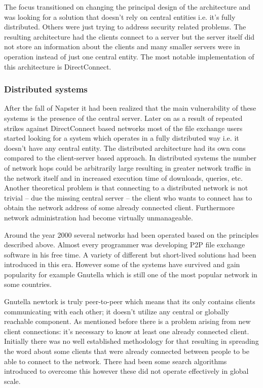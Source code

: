 \documentclass[a4paper]{article}
\begin{document}
The focus transitioned on changing the principal design of the architecture and was looking for a solution that doesn't
rely on central entities i.e. it's fully distributed. Others were just trying to address security related problems. The
resulting architecture had the clients connect to a server but the server itself did not store an information about the
clients and many smaller servers were in operation instead of just one central entity. The most notable implementation
of this architecture is DirectConnect.

\subsubsection{Distributed systems}

After the fall of Napster it had been realized that the main vulnerability of these systems is the presence of the
central server. Later on as a result of repeated strikes against DirectConnect based networks most of the file exchange
users started looking for a system which operates in a fully distributed way i.e. it doesn't have any central entity.
The distributed architecture had its own cons compared to the client-server based approach. In distributed systems the
number of network hops could be arbitrarily large resulting in greater network traffic in the network itself and in
increased execution time of downloads, queries, etc. Another theoretical problem is that connecting to a distributed
network is not trivial -- due the missing central server -- the client who wants to connect has to obtain the network
address of some already connected client. Furthermore network administration had become virtually unmanageable.

Around the year 2000 several networks had been operated based on the principles described above. Almost every
programmer was developing P2P file exchange software in his free time. A variety of different but short-lived solutions
had been introduced in this era. However some of the systems have survived and gain popularity for example Gnutella
which is still one of the most popular network in some countries.

Gnutella newtork is truly peer-to-peer which means that its only contains clients communicating with each other; it
doesn't utilize any central or globally reachable component. As mentioned before there is a problem arising from new
client connections: it's necessary to know at least one already connected client. Initially there was no well
established methodology for that resulting in spreading the word about some clients that were already connected between
people to be able to connect to the network. There had been some search algorithms introduced to overcome this however
these did not operate effectively in global scale.
\end{document}
